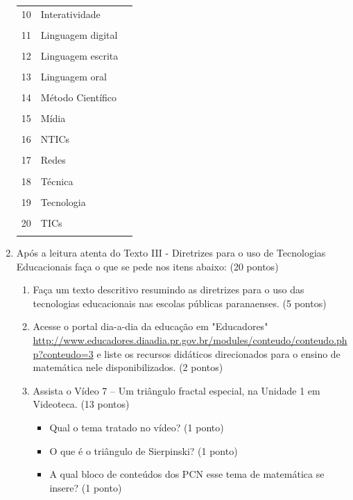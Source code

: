 \documentclass[a4paper, 12pt]{article}
\begin{document}
\begin{enumerate}
\begin{tabular}{|m{0.5cm}|m{5cm}|m{8cm}|}
      \hline
      10 & Interatividade & \\ \\
      \hline
      11 & Linguagem digital & \\ \\
      \hline
      12 & Linguagem escrita & \\ \\
      \hline
      13 & Linguagem oral & \\ \\
      \hline
      14 & Método Científico & \\ \\
      \hline
      15 & Mídia & \\ \\
      \hline
      16 & NTICs & \\ \\
      \hline
      17 & Redes & \\ \\
      \hline
      18 & Técnica & \\ \\
      \hline
      19 & Tecnologia & \\ \\
      \hline
      20 & TICs & \\ \\
      \hline
    \end{tabular}
  \item Após a leitura  atenta do Texto III - Diretrizes para o uso de Tecnologias Educacionais   faça o que se pede nos itens abaixo: (20 pontos)
    \begin{enumerate}
    \item Faça um texto descritivo  resumindo as diretrizes para o uso das tecnologias educacionais nas escolas públicas paranaenses. (5 pontos)
    \item Acesse o portal dia-a-dia da educação  em  "Educadores"
      \url{http://www.educadores.diaadia.pr.gov.br/modules/conteudo/conteudo.php?conteudo=3}
      e liste os recursos didáticos direcionados para o ensino de matemática nele disponibilizados. (2 pontos)
    \item Assista o Vídeo 7 – Um triângulo fractal especial, na Unidade 1 em Videoteca. (13 pontos)
      \begin{itemize}
      \item Qual o tema tratado no vídeo? (1 ponto)
      \item O que é o triângulo de Sierpinski? (1 ponto)
      \item A qual bloco de conteúdos dos PCN esse tema de matemática se insere? (1 ponto)

\end{itemize}
\end{enumerate}
\end{enumerate}
\end{document}
